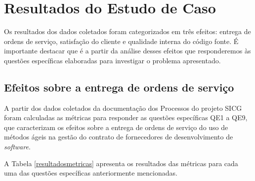 \section{Resultados do Estudo de Caso}
\label{sec:resultados}


Os resultados dos dados coletados foram categorizados em três efeitos: entrega de ordens de serviço, satisfação do cliente e qualidade interna do código fonte. É importante destacar que é a partir da análise desses efeitos que responderemos às questões específicas elaboradas para investigar o problema apresentado. 

\subsection[Efeitos sobre a entrega de ordens de serviço]{Efeitos sobre a entrega de ordens de serviço}

A partir dos dados coletados da documentação dos Processos do projeto SICG foram calculadas as métricas para responder as questões específicas QE1 a QE9, que caracterizam os efeitos sobre a entrega de ordens de serviço do uso de métodos ágeis na gestão do contrato de fornecedores de desenvolvimento de \textit{software}.

A Tabela \ref{resultadosmetricas} apresenta os resultados das métricas para cada uma das questões específicas anteriormente mencionadas.


